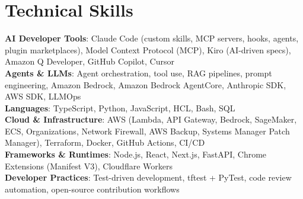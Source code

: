 \section{\textbf{Technical Skills}}
\vspace{-2pt}
\begin{itemize}[leftmargin=0.05in, label={}]
    \small{\item{
     \textbf{AI Developer Tools}{: Claude Code (custom skills, MCP servers, hooks, agents, plugin marketplaces), Model Context Protocol (MCP), Kiro (AI-driven specs), Amazon Q Developer, GitHub Copilot, Cursor} \\
     \textbf{Agents \& LLMs}{: Agent orchestration, tool use, RAG pipelines, prompt engineering, Amazon Bedrock, Amazon Bedrock AgentCore, Anthropic SDK, AWS SDK, LLMOps} \\
     \textbf{Languages}{: TypeScript, Python, JavaScript, HCL, Bash, SQL} \\
     \textbf{Cloud \& Infrastructure}{: AWS (Lambda, API Gateway, Bedrock, SageMaker, ECS, Organizations, Network Firewall, AWS Backup, Systems Manager Patch Manager), Terraform, Docker, GitHub Actions, CI/CD} \\
     \textbf{Frameworks \& Runtimes}{: Node.js, React, Next.js, FastAPI, Chrome Extensions (Manifest V3), Cloudflare Workers} \\
     \textbf{Developer Practices}{: Test-driven development, tftest + PyTest, code review automation, open-source contribution workflows}
    }}
\end{itemize}
\vspace{-2mm}
